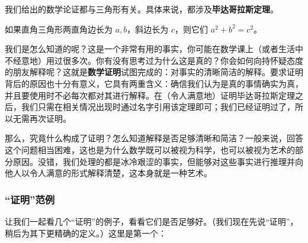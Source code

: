 我们给出的数学论证都与三角形有关。具体来说，都涉及\textbf{毕达哥拉斯定理}。

\begin{theorem}[毕达哥拉斯定理] \label{thm:pythagorean}
    如果直角三角形两直角边长为 $a,b$，斜边长为 $c$，则它们 $a^2+b^2=c^2$。
\end{theorem}

\begin{center}
\end{center}

我们是怎么知道的呢？这是一个非常有用的事实，你可能在数学课上（或者生活中不经意地）用过很多次。你有没有思考过为什么这是真的？你会如何向持怀疑态度的朋友解释呢？这就是\textbf{数学证明}试图完成的：对事实的清晰简洁的解释。要求证明背后的原因也十分有意义，它具有两重含义：确信我们认为是真的事情确实为真，并且要使用时不必每次都对其进行解释。在（令人满意地）证明毕达哥拉斯定理之后，我们只需在相关情况出现时通过名字引用该定理即可；我们已经证明过了，所以无需再次证明。

那么，究竟什么构成了证明？怎么知道解释是否足够清晰和简洁？一般来说，回答这个问题相当困难，这也是为什么数学既可以被视为科学，也可以被视为艺术的部分原因。没错，我们处理的都是冰冷艰涩的事实，但能够对这些事实进行推理并向他人以令人满意的形式解释清楚，这本身就是一种艺术。

\subsubsection*{``证明''范例}

让我们一起看几个``证明''的例子，看看它们是否足够好。（我们现在先说``证明''，稍后为其下更精确的定义。）这里是第一个：

